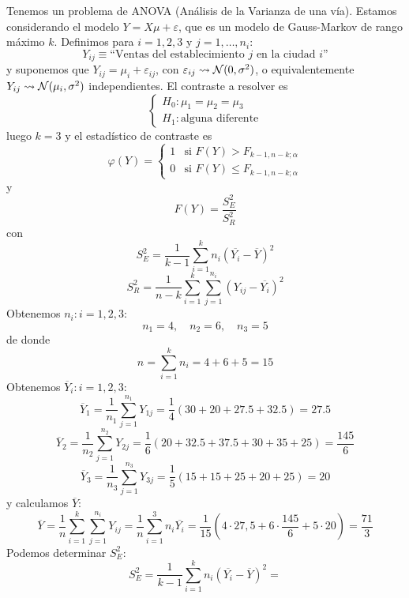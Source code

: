 \documentclass[12pt]{article}
\begin{document}
\begin{ejercicio}
\begin{enumerate}[label=\alph*)]
                Tenemos un problema de ANOVA (Análisis de la Varianza de una vía). Estamos considerando
                el modelo $Y = X \mu + \varepsilon$, que es un modelo de Gauss-Markov de rango máximo
                $k$. Definimos para $i=1,2,3$ y $j = 1, \ldots, n_i$:
                $$Y_{ij} \equiv \text{``Ventas del establecimiento $j$ en la ciudad $i$''}$$
                y suponemos que $Y_{ij} = \mu_i + \varepsilon_{ij}$, con $\varepsilon_{ij} \rightsquigarrow 
                \mathcal{N}(0, \sigma^2)$, o equivalentemente $Y_{ij} \rightsquigarrow \mathcal{N}(\mu_i, \sigma^2)$
                independientes. El contraste a resolver es
                $$\begin{cases}
                    H_0 : \mu_1 = \mu_2 = \mu_3 \\
                    H_1 : \text{alguna diferente}
                \end{cases}$$
                luego $k=3$ y el estadístico de contraste es
                $$\varphi(Y) = \begin{cases}
                    1 &\text{si } F(Y) > F_{k-1, n-k; \alpha} \\
                    0 &\text{si } F(Y) \leq F_{k-1, n-k; \alpha}
                \end{cases}$$
                y $$F(Y) = \dfrac{S_E^2}{S_R^2}$$
                con 
                $$S_E^2 = \dfrac{1}{k-1} \sum_{i=1}^{k} n_i (\overline{Y_i} - \overline{Y})^2$$
                $$S_R^2 = \dfrac{1}{n-k} \sum_{i=1}^{k} \sum_{j=1}^{n_i} (Y_{ij} - \overline{Y_i})^2$$
                Obtenemos $n_i : i =1,2,3$:
                $$n_1 = 4, \quad n_2 = 6, \quad n_3 = 5$$
                de donde $$n = \sum_{i=1}^{k} n_i = 4+6+5 = 15$$
                Obtenemos $\overline{Y}_i : i =1,2,3$:
                $$\overline{Y}_1 = \dfrac{1}{n_1} \sum_{j=1}^{n_1} Y_{1j} = \dfrac{1}{4} (30+20+27.5+32.5) = 27.5$$
                $$\overline{Y}_2 = \dfrac{1}{n_2} \sum_{j=1}^{n_2} Y_{2j} = \dfrac{1}{6} 
                (20+32.5+37.5+30+35+25) = \dfrac{145}{6}$$
                $$\overline{Y}_3 = \dfrac{1}{n_3} \sum_{j=1}^{n_3} Y_{3j} = \dfrac{1}{5} 
                (15+15+25+20+25) = 20$$
                y calculamos $\overline{Y}$:
                $$\overline{Y} = \dfrac{1}{n} \sum_{i=1}^{k} \sum_{j=1}^{n_i} Y_{ij} = 
                \dfrac{1}{n} \sum_{i=1}^{3} n_i \overline{Y_i} = \dfrac{1}{15} (4 \cdot 27,5 + 
                6 \cdot \dfrac{145}{6} + 5 \cdot 20) = \dfrac{71}{3}$$
                Podemos determinar $S_E^2$:
                $$S_E^2 = \dfrac{1}{k-1} \sum_{i=1}^{k} n_i (\overline{Y_i} - \overline{Y})^2 = 
$$
\end{enumerate}
\end{ejercicio}
\end{document}
